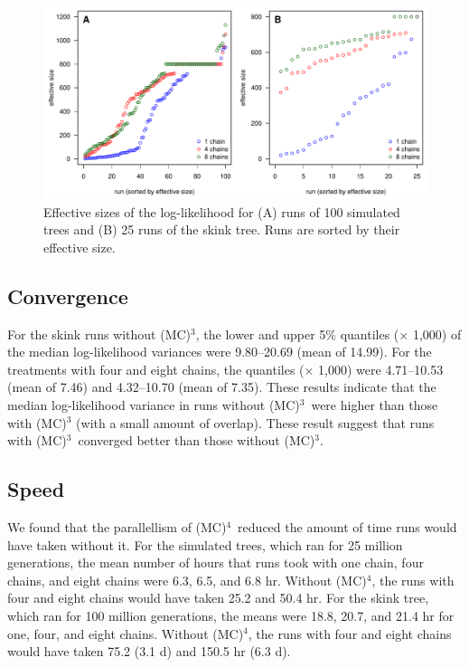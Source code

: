 \documentclass[12pt]{article}
\newcommand{\MCMCMC}{(MC)$^{3}$}
\newcommand{\MCMCMCMC}{(MC)$^{4}$}
\begin{document}
\begin{figure}
\begin{center}
\includegraphics[width=14cm]{eff-size.pdf}
\end{center}
\caption{Effective sizes of the log-likelihood for
    (A) runs of 100 simulated trees and (B) 25 runs of the skink tree.
    Runs are sorted by their effective size.}
\label{fig:eff-size}
\end{figure}


\subsection*{Convergence}

For the skink runs without \MCMCMC,
the lower and upper 5\% quantiles ($\times$ 1,000)
of the median log-likelihood variances were 9.80--20.69 (mean of 14.99).
%
For the treatments with four and eight chains,
the quantiles ($\times$ 1,000) were 4.71--10.53 (mean of 7.46)
and 4.32--10.70 (mean of 7.35).
%
These results indicate that the median log-likelihood variance
in runs without \MCMCMC\ were higher than those with \MCMCMC
(with a small amount of overlap).
%
These result suggest that runs with \MCMCMC\ 
converged better than those without \MCMCMC.


\subsection*{Speed}

We found that the parallellism of \MCMCMCMC\ 
reduced the amount of time runs would have taken without it.
%
For the simulated trees, which ran for 25 million generations,
the mean number of hours that runs took with
one chain, four chains, and eight chains were
6.3, 6.5, and 6.8 hr.
%
Without \MCMCMCMC, the runs with four and eight chains
would have taken 25.2 and 50.4 hr.
%
For the skink tree, which ran for 100 million generations,
the means were 18.8, 20.7, and 21.4 hr for one, four, and eight chains.
%
Without \MCMCMCMC, the runs with four and eight chains
would have taken 75.2 (3.1 d) and 150.5 hr (6.3 d).
\end{document}
